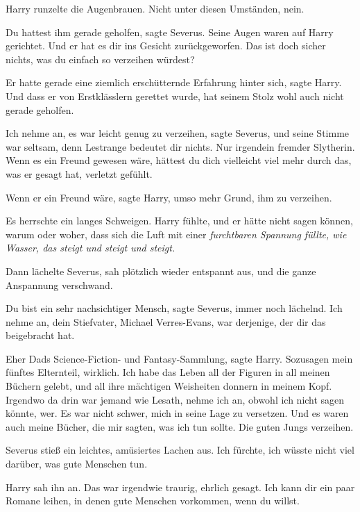 Harry runzelte die Augenbrauen. \glqq{}Nicht unter diesen Umständen,
nein.\grqq{}

\glqq{}Du hattest ihm gerade geholfen\grqq{}, sagte Severus. Seine Augen waren
auf Harry gerichtet. \glqq{}Und er hat es dir ins Gesicht zurückgeworfen. Das
ist doch sicher nichts, was du einfach so verzeihen würdest?\grqq{}

\glqq{}Er hatte gerade eine ziemlich erschütternde Erfahrung hinter sich\grqq{},
sagte Harry. \glqq{}Und dass er von Erstklässlern gerettet wurde, hat seinem
Stolz wohl auch nicht gerade geholfen.\grqq{}

\glqq{}Ich nehme an, es war leicht genug zu verzeihen\grqq{}, sagte Severus, und
seine Stimme war seltsam, \glqq{}denn Lestrange bedeutet dir nichts. Nur
irgendein fremder Slytherin. Wenn es ein Freund gewesen wäre, hättest du dich
vielleicht viel mehr durch das, was er gesagt hat, verletzt gefühlt.\grqq{}

\glqq{}Wenn er ein Freund wäre\grqq{}, sagte Harry, \glqq{}umso mehr Grund, ihm
zu verzeihen.\grqq{}

Es herrschte ein langes Schweigen. Harry fühlte, und er hätte nicht sagen
können, warum oder woher, dass sich die Luft mit einer \emph{furchtbaren
Spannung füllte, wie Wasser, das steigt und steigt und steigt.}

Dann lächelte Severus, sah plötzlich wieder entspannt aus, und die ganze
Anspannung verschwand.

\glqq{}Du bist ein sehr nachsichtiger Mensch\grqq{}, sagte Severus, immer noch
lächelnd. \glqq{}Ich nehme an, dein Stiefvater, Michael Verres-Evans, war
derjenige, der dir das beigebracht hat.\grqq{}

\glqq{}Eher Dads Science-Fiction- und Fantasy-Sammlung\grqq{}, sagte Harry.
\glqq{}Sozusagen mein fünftes Elternteil, wirklich. Ich habe das Leben all der
Figuren in all meinen Büchern gelebt, und all ihre mächtigen Weisheiten donnern
in meinem Kopf. Irgendwo da drin war jemand wie Lesath, nehme ich an, obwohl ich
nicht sagen könnte, wer. Es war nicht schwer, mich in seine Lage zu versetzen.
Und es waren auch meine Bücher, die mir sagten, was ich tun sollte. Die guten
Jungs verzeihen.\grqq{}

Severus stieß ein leichtes, amüsiertes Lachen aus. \glqq{}Ich fürchte, ich
wüsste nicht viel darüber, was gute Menschen tun.\grqq{}

Harry sah ihn an. Das war irgendwie traurig, ehrlich gesagt. \glqq{}Ich kann dir
ein paar Romane leihen, in denen gute Menschen vorkommen, wenn du willst.\grqq{}

